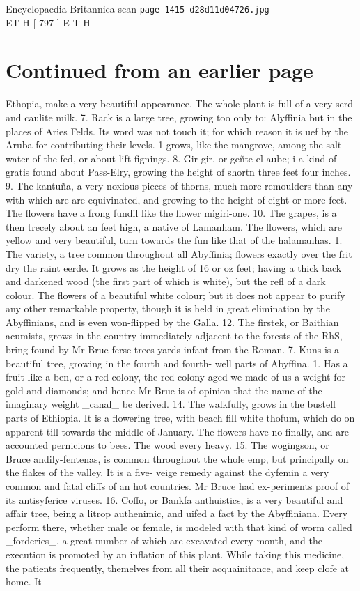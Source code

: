 \documentclass{article}
\begin{document}
\begin{center}
{\Large Encyclopaedia Britannica scan \texttt{page-1415-d28d11d04726.jpg}}\\[0.5em]
ET H  [ 797 ] E T H
\end{center}
\section*{Continued from an earlier page}
Ethopia, make a very beautiful appearance. The whole plant is full of a very serd and caulite milk. 7. Rack is a large tree, growing too only to: Alyffinia but in the places of Aries Felds. Its word was not touch it; for which reason it is uef by the Aruba for contributing their levels. 1 grows, like the mangrove, among the salt-water of the fed, or about lift fignings. 8. Gir-gir, or geñte-el-aube; i a kind of gratis found about Pass-Elry, growing the height of shortn three feet four inches. 9. The kantuña, a very noxious pieces of thorns, much more remoulders than any with which are are equivinated, and growing to the height of eight or more feet. The flowers have a frong fundil like the flower migiri-one. 10. The grapes, is a then trecely about an feet high, a native of Lamanham. The flowers, which are yellow and very beautiful, turn towards the fun like that of the halamanhas. 1. The variety, a tree common throughout all Abyffinia; flowers exactly over the frit dry the raint eerde. It grows as the height of 16 or oz feet; having a thick back and darkened wood (the first part of which is white), but the refl of a dark colour. The flowers of a beautiful white colour; but it does not appear to purify any other remarkable property, though it is held in great elimination by the Abyffinians, and is even won-flipped by the Galla. 12. The firstek, or Baithian acumists, grows in the country immediately adjacent to the forests of the RhS, bring found by Mr Brue ferse trees yards infant from the Roman. 7. Kuns is a beautiful tree, growing in the fourth and fourth- well parts of Abyffina. 1. Has a fruit like a ben, or a red colony, the red colony aged we made of us a weight for gold and diamonds; and hence Mr Brue is of opinion that the name of the imaginary weight \_canal\_ be derived. 14. The walkfully, grows in the bustell parts of Ethiopia. It is a flowering tree, with beach fill white thofum, which do on apparent till towards the middle of January. The flowers have no finally, and are accounted pernicions to bees. The wood every heavy. 15. The wogingson, or Bruce andily-fentenas, is common throughout the whole emp, but principally on the flakes of the valley. It is a five- veige remedy against the dyfemin a very common and fatal cliffs of an hot countries. Mr Bruce had ex-periments proof of its antisyferice viruses. 16. Coffo, or Bankfa anthuistics, is a very beautiful and affair tree, being a litrop authenimic, and uifed a fact by the Abyffiniana. Every perform there, whether male or female, is modeled with that kind of worm called \_forderies\_, a great number of which are excavated every month, and the execution is promoted by an inflation of this plant. While taking this medicine, the patients frequently, themelves from all their acquainitance, and keep clofe at home. It 
\end{document}
